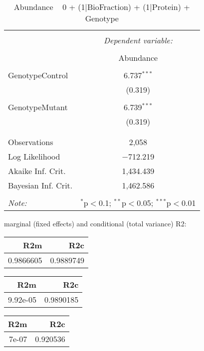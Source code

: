 \documentclass[11pt]{report}
\begin{document}
\begin{table}[!htbp] \centering 
  \caption{Abundance ~ 0 + (1|BioFraction) + (1|Protein) + Genotype} 
  \label{} 
\begin{tabular}{@{\extracolsep{5pt}}lc} 
\\[-1.8ex]\hline 
\hline \\[-1.8ex] 
 & \multicolumn{1}{c}{\textit{Dependent variable:}} \\ 
\cline{2-2} 
\\[-1.8ex] & Abundance \\ 
\hline \\[-1.8ex] 
 GenotypeControl & 6.737$^{***}$ \\ 
  & (0.319) \\ 
  & \\ 
 GenotypeMutant & 6.739$^{***}$ \\ 
  & (0.319) \\ 
  & \\ 
\hline \\[-1.8ex] 
Observations & 2,058 \\ 
Log Likelihood & $-$712.219 \\ 
Akaike Inf. Crit. & 1,434.439 \\ 
Bayesian Inf. Crit. & 1,462.586 \\ 
\hline 
\hline \\[-1.8ex] 
\textit{Note:}  & \multicolumn{1}{r}{$^{*}$p$<$0.1; $^{**}$p$<$0.05; $^{***}$p$<$0.01} \\ 
\end{tabular} 
\end{table} 
marginal (fixed effects) and conditional (total variance) R2:

\begin{tabular}{r|r}
\hline
R2m & R2c\\
\hline
0.9866605 & 0.9889749\\
\hline
\end{tabular}

\begin{tabular}{r|r}
\hline
R2m & R2c\\
\hline
9.92e-05 & 0.9890185\\
\hline
\end{tabular}

\begin{tabular}{r|r}
\hline
R2m & R2c\\
\hline
7e-07 & 0.920536\\
\hline
\end{tabular}
\end{document}
